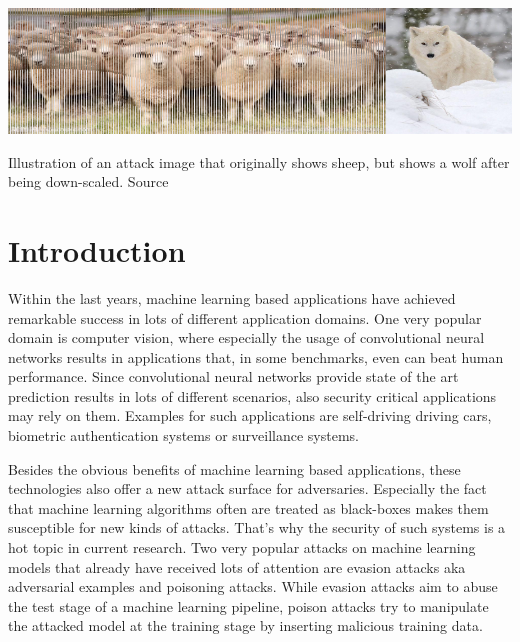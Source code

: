\documentclass[sigconf]{acmart}
\begin{document}


\begin{teaserfigure}
  \includegraphics[width=\textwidth]{teaser.png}
  \caption{Illustration of an attack image that originally shows sheep, but shows a wolf after being down-scaled. Source \cite{camouflage}}
  \label{fig:teaser}
\end{teaserfigure}

\maketitle

\section{Introduction}
Within the last years, machine learning based applications have achieved remarkable success in lots of different application domains.
One very popular domain is computer vision, where especially the usage of convolutional neural networks results in applications that, in some benchmarks, even can beat human performance.
Since convolutional neural networks provide state of the art prediction results in lots of different scenarios, also security critical applications may rely on them.
Examples for such applications are self-driving driving cars, biometric authentication systems or surveillance systems.

Besides the obvious benefits of machine learning based applications, these technologies also offer a new attack surface for adversaries.
Especially the fact that machine learning algorithms often are treated as black-boxes makes them susceptible for new kinds of attacks.
That's why the security of such systems is a hot topic in current research.
Two very popular attacks on machine learning models that already have received lots of attention are evasion attacks aka adversarial examples and poisoning attacks.
While evasion attacks aim to abuse the test stage of a machine learning pipeline, poison attacks try to manipulate the attacked model at the training stage by inserting malicious training data.
\end{document}
